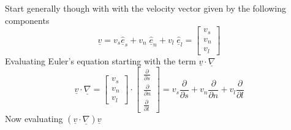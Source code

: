 Start generally though with with the velocity vector given by the following components
\begin{equation*}
  \underline{v}=
  v_{s}\hat{\underline{e}}_{s}+v_{n}\;\hat{\underline{e}}_{n}+v_{l}\;\hat{\underline{e}}_{l}=
  \begin{bmatrix}
    v_{s} \\
    v_{n} \\
    v_{l}
  \end{bmatrix}
\end{equation*}
Evaluating Euler's equation starting with the term $\underline{v}\cdot\underline{\nabla}$
\begin{equation*}
  \underline{v}\cdot\underline{\nabla}=
  \begin{bmatrix}
    v_{s} \\
    v_{n} \\
    v_{l}
  \end{bmatrix}
  \cdot
  \begin{bmatrix}
    \frac{\partial}{\partial{}s} \\
    \frac{\partial}{\partial{}n} \\
    \frac{\partial}{\partial{}l}
  \end{bmatrix}=
  v_{s}\frac{\partial}{\partial{}s}+
  v_{n}\frac{\partial}{\partial{}n}+
  v_{l}\frac{\partial}{\partial{}l}
\end{equation*}
Now evaluating $(\underline{v}\cdot\underline{\nabla})\underline{v}$
